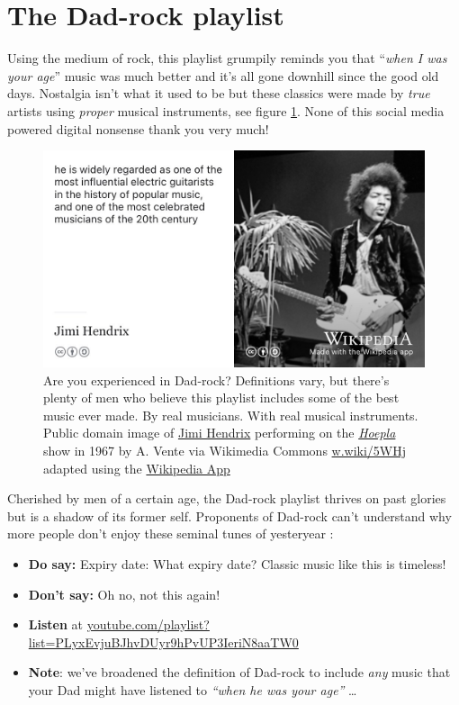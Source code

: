 \documentclass[
]{book}
\providecommand{\tightlist}{%
  \setlength{\itemsep}{0pt}\setlength{\parskip}{0pt}}
\begin{document}
\hypertarget{dadrock}{%
\section{The Dad-rock playlist}\label{dadrock}}

Using the medium of rock, this playlist grumpily reminds you that ``\emph{when I was your age}'' music was much better and it's all gone downhill since the good old days. Nostalgia isn't what it used to be but these classics were made by \emph{true} artists using \emph{proper} musical instruments, see figure \ref{fig:jimi-hendrix-fig}. None of this social media powered digital nonsense thank you very much! \citep{lanier}

\begin{figure}
\includegraphics[width=0.99\linewidth]{images/jimi-hendrix} \caption{Are you experienced in Dad-rock? \citep{hendrix} Definitions vary, but there's plenty of men who believe this playlist includes some of the best music ever made. By real musicians. With real musical instruments. Public domain image of \href{https://en.wikipedia.org/wiki/Jimi_Hendrix}{Jimi Hendrix} performing on the \emph{\href{https://en.wikipedia.org/wiki/Hoepla}{Hoepla}} show in 1967 by A. Vente via Wikimedia Commons \href{https://w.wiki/5WHj}{w.wiki/5WHj} adapted using the \href{https://apps.apple.com/gb/app/wikipedia/id324715238}{Wikipedia App}}\label{fig:jimi-hendrix-fig}
\end{figure}



Cherished by men of a certain age, the Dad-rock playlist thrives on past glories but is a shadow of its former self. Proponents of Dad-rock can't understand why more people don't enjoy these seminal tunes of yesteryear \citep{dadrock, dadrock2}:

\begin{itemize}
\tightlist
\item
  \textbf{Do say:} Expiry date: What expiry date? Classic music like this is timeless!
\item
  \textbf{Don't say:} Oh no, not this again!
\item
  \textbf{Listen} at \href{https://www.youtube.com/playlist?list=PLyxEvjuBJhvDUyr9hPvUP3IeriN8aaTW0}{youtube.com/playlist?list=PLyxEvjuBJhvDUyr9hPvUP3IeriN8aaTW0}
\item
  \textbf{Note}: we've broadened the definition of Dad-rock to include \emph{any} music that your Dad might have listened to \emph{``when he was your age''} \ldots{}
\end{itemize}
\end{document}
